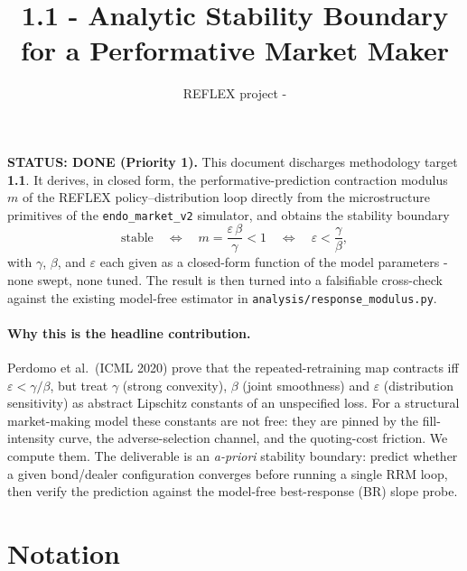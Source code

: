 \documentclass[11pt]{article}
\title{\textbf{1.1 - Analytic Stability Boundary\\ for a Performative Market Maker}}
\author{REFLEX project - \code{math-theory}}
\date{}
\newcommand{\eps}{\varepsilon}
\newcommand{\code}[1]{\texttt{#1}}
\begin{document}
\maketitle

\noindent\textbf{STATUS: DONE (Priority 1).} This document discharges
methodology target \textbf{1.1}. It derives, in closed form, the
performative-prediction contraction modulus $m$ of the REFLEX
policy--distribution loop directly from the microstructure primitives of the
\code{endo\_market\_v2} simulator, and obtains the stability boundary
%
\begin{equation*}
  \text{stable} \quad\Longleftrightarrow\quad
  m = \frac{\eps\,\beta}{\gamma} < 1
  \quad\Longleftrightarrow\quad
  \eps < \frac{\gamma}{\beta},
\end{equation*}
%
with $\gamma$, $\beta$, and $\eps$ each given as a closed-form function of the
model parameters - none swept, none tuned. The result is then turned into a
falsifiable cross-check against the existing model-free estimator in
\code{analysis/response\_modulus.py}.

\paragraph{Why this is the headline contribution.}
Perdomo et al.\ (ICML 2020) prove that the repeated-retraining map contracts iff
$\eps < \gamma/\beta$, but treat $\gamma$ (strong convexity), $\beta$ (joint
smoothness) and $\eps$ (distribution sensitivity) as abstract Lipschitz
constants of an unspecified loss. For a structural market-making model these
constants are not free: they are pinned by the fill-intensity curve, the
adverse-selection channel, and the quoting-cost friction. We compute them. The
deliverable is an \emph{a-priori} stability boundary: predict whether a given
bond/dealer configuration converges before running a single RRM loop, then
verify the prediction against the model-free best-response (BR) slope probe.

\section{Notation}
\end{document}
